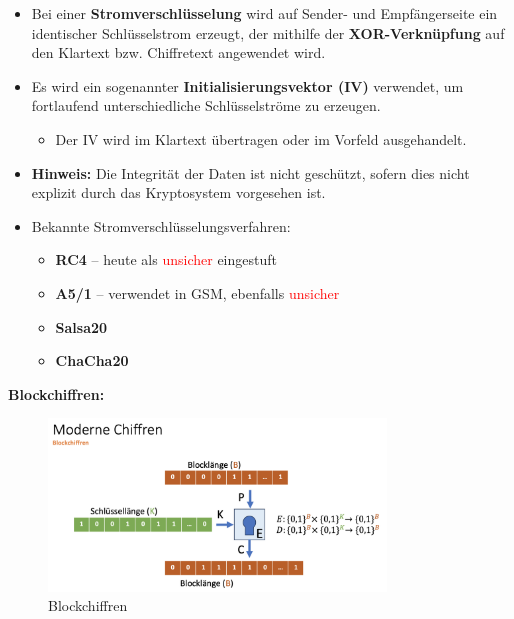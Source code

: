 \documentclass[a4paper,12pt]{article}
\begin{document}
\begin{itemize}
    \item Bei einer \textbf{Stromverschlüsselung} wird auf Sender- und Empfängerseite ein identischer Schlüsselstrom erzeugt, der mithilfe der \textbf{XOR-Verknüpfung} auf den Klartext bzw. Chiffretext angewendet wird.
    
    \item Es wird ein sogenannter \textbf{Initialisierungsvektor (IV)} verwendet, um fortlaufend unterschiedliche Schlüsselströme zu erzeugen.
    \begin{itemize}
        \item Der IV wird im Klartext übertragen oder im Vorfeld ausgehandelt.
    \end{itemize}
    
    \item \textbf{Hinweis:} Die Integrität der Daten ist nicht geschützt, sofern dies nicht explizit durch das Kryptosystem vorgesehen ist.
    
    \item Bekannte Stromverschlüsselungsverfahren:
    \begin{itemize}
        \item \textbf{RC4} – heute als \textcolor{red}{unsicher} eingestuft
        \item \textbf{A5/1} – verwendet in GSM, ebenfalls \textcolor{red}{unsicher}
        \item \textbf{Salsa20}
        \item \textbf{ChaCha20}
    \end{itemize}
\end{itemize}
\vspace{1em}
\noindent\textbf{Blockchiffren:}
\begin{figure}[H]
    \centering
    \includegraphics[width=0.8\textwidth]{bilder/blockchiffren.png}
    \caption{Blockchiffren}
    \label{fig:blockchiffren}
\end{figure}
\end{document}
